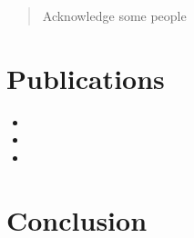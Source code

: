 \documentclass[a4paper, twoside, openright, 11pt, oldfontcommands]{memoir}
\begin{document}
\newpage

\renewcommand{\abstractname}{Acknowledgements}
\begin{abstract}
Acknowledge some people
\end{abstract}

\chapter{Publications}
\begin{itemize}
    \item {}
    \item {}
    \item {}
\end{itemize}

\clearpage

\setcounter{secnumdepth}{3}
\setcounter{tocdepth}{3}
\tableofcontents

\newpage

\mainmatter















\chapter{Conclusion}

\backmatter
\cleardoublepage


\end{document}
